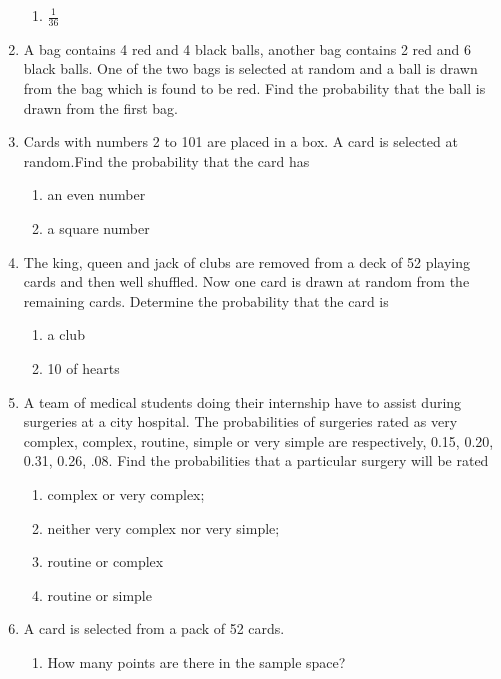 \begin{enumerate}[label=\thesection.\arabic*,ref=\thesection.\theenumi]
\begin{enumerate}
    \item $\frac{1}{36}$ 
\end{enumerate}
\solution
		
	\item A bag contains 4 red and 4 black balls, another bag contains 2 red and 6 black balls. One of the two bags is selected at random and a ball is drawn from the bag which is found to be red. Find the probability that the ball is drawn from the first bag.
\\
\solution
		
  \item
  Cards with numbers 2 to 101 are placed in a box. A card is selected at random.Find the probability that the card has
\begin{enumerate}[label=(\roman*)]
	\item an even number 
	\item a square number
\end{enumerate}
\solution

\item
The king, queen and jack of clubs are removed from a deck of 52 playing cards and then well shuffled. Now one card is drawn at random from the remaining cards.  Determine the probability that the card is
\begin{enumerate}[label=(\roman*)]
\item a club
\item 10 of hearts
\end{enumerate}
\solution

\item A team of medical students doing their internship have to assist during surgeries
at a city hospital. The probabilities of surgeries rated as very complex, complex,
routine, simple or very simple are respectively, 0.15, 0.20, 0.31, 0.26, .08. Find
the probabilities that a particular surgery will be rated
\begin{enumerate}
	\item complex or very complex;
	\item neither very complex nor very simple;
	\item routine or complex
	\item routine or simple
\end{enumerate}
\solution

\item A card is selected from a pack of 52 cards.
\begin{enumerate}[label=(\alph*)]
    \item How many points are there in the sample space?

\end{enumerate}
\end{enumerate}
